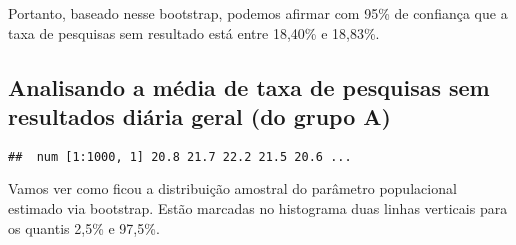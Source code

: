 \documentclass[]{article}
\newenvironment{Shaded}{\begin{snugshade}}{\end{snugshade}}
\newcommand{\KeywordTok}[1]{\textcolor[rgb]{0.13,0.29,0.53}{\textbf{#1}}}
\newcommand{\DataTypeTok}[1]{\textcolor[rgb]{0.13,0.29,0.53}{#1}}
\newcommand{\DecValTok}[1]{\textcolor[rgb]{0.00,0.00,0.81}{#1}}
\newcommand{\StringTok}[1]{\textcolor[rgb]{0.31,0.60,0.02}{#1}}
\newcommand{\CommentTok}[1]{\textcolor[rgb]{0.56,0.35,0.01}{\textit{#1}}}
\newcommand{\OperatorTok}[1]{\textcolor[rgb]{0.81,0.36,0.00}{\textbf{#1}}}
\newcommand{\NormalTok}[1]{#1}
\begin{document}
Portanto, baseado nesse bootstrap, podemos afirmar com 95\% de confiança
que a taxa de pesquisas sem resultado está entre 18,40\% e 18,83\%.

\subsection{Analisando a média de taxa de pesquisas sem resultados
diária geral (do grupo
A)}\label{analisando-a-media-de-taxa-de-pesquisas-sem-resultados-diaria-geral-do-grupo-a}

\begin{Shaded}
\end{Shaded}

\begin{verbatim}
##  num [1:1000, 1] 20.8 21.7 22.2 21.5 20.6 ...
\end{verbatim}

Vamos ver como ficou a distribuição amostral do parâmetro populacional
estimado via bootstrap. Estão marcadas no histograma duas linhas
verticais para os quantis 2,5\% e 97,5\%.
\end{document}
